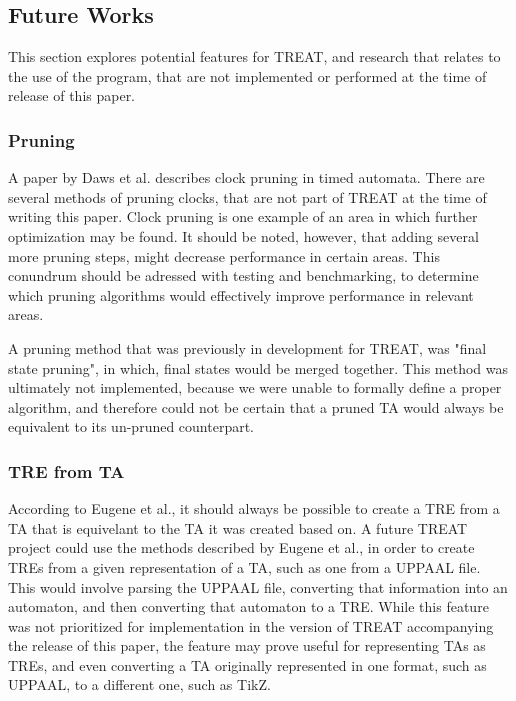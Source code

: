 \subsection{Future Works}\label{subsec:futureWorks}
This section explores potential features for TREAT, and research that relates to the use of the program, that are not implemented or performed at the time of release of this paper.

\subsubsection{Pruning}\label{futureWorks:pruning}
A paper by Daws et al. \cite{Daws1996} describes clock pruning in timed automata. There are several methods of pruning clocks, that are not part of TREAT at the time of writing this paper.
Clock pruning is one example of an area in which further optimization may be found. It should be noted, however, that adding several more pruning steps, might decrease performance in certain areas.
This conundrum should be adressed with testing and benchmarking, to determine which pruning algorithms would effectively improve performance in relevant areas.

A pruning method that was previously in development for TREAT, was "final state pruning", in which, final states would be merged together. This method was ultimately not implemented, because we were unable to formally define a proper algorithm, and therefore could not be certain that a pruned TA would always be equivalent to its un-pruned counterpart.


\subsubsection{TRE from TA}
According to Eugene et al.\cite{Eugene2001}, it should always be possible to create a TRE from a TA that is equivelant to the TA it was created based on.
A future TREAT project could use the methods described by Eugene et al., in order to create TREs from a given representation of a TA, such as one from a UPPAAL file.
This would involve parsing the UPPAAL file, converting that information into an automaton, and then converting that automaton to a TRE.
While this feature was not prioritized for implementation in the version of TREAT accompanying the release of this paper, the feature may prove useful for representing TAs as TREs, and even converting a TA originally represented in one format, such as UPPAAL, to a different one, such as TikZ.

